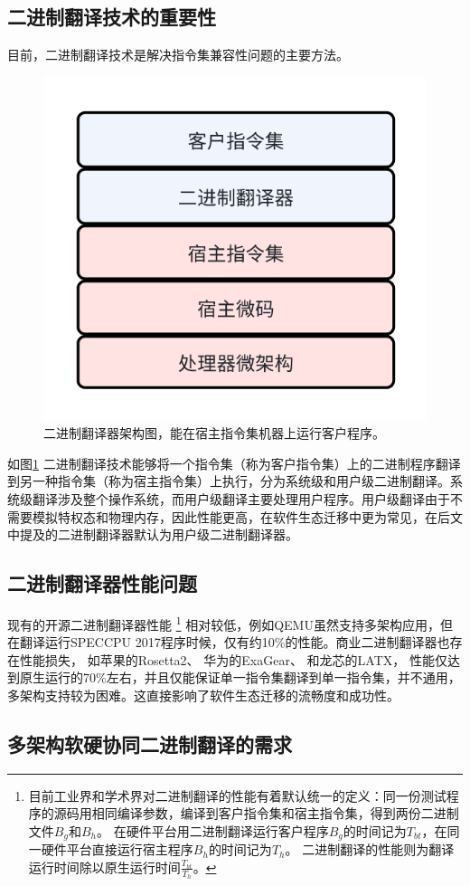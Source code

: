 \documentclass{Style/ucasproposal}%
\begin{document}
\subsection{二进制翻译技术的重要性}
目前，二进制翻译技术是解决指令集兼容性问题的主要方法。

\begin{figure}[h]
    \centering
    \includegraphics[width=0.3\linewidth]{./feishuImage/BT_arch.png}
    \caption{二进制翻译器架构图，能在宿主指令集机器上运行客户程序。}
    \label{img:BT_arch}
  \end{figure}

如图\ref{img:BT_arch} 二进制翻译技术能够将一个指令集（称为客户指令集）上的二进制程序翻译到另一种指令集（称为宿主指令集）上执行，分为系统级和用户级二进制翻译。系统级翻译涉及整个操作系统，而用户级翻译主要处理用户程序。用户级翻译由于不需要模拟特权态和物理内存，因此性能更高，在软件生态迁移中更为常见，在后文中提及的二进制翻译器默认为用户级二进制翻译器。

\subsection{二进制翻译器性能问题}
现有的开源二进制翻译器性能
\footnote{
    目前工业界和学术界对二进制翻译的性能有着默认统一的定义：同一份测试程序的源码用相同编译参数，编译到客户指令集和宿主指令集，得到两份二进制文件$B_g$和$B_h$。
    在硬件平台用二进制翻译运行客户程序$B_g$的时间记为$T_{bt}$，在同一硬件平台直接运行宿主程序$B_h$的时间记为$T_h$。
    二进制翻译的性能则为翻译运行时间除以原生运行时间$\frac{T_{bt}}{T_h}$。
}
相对较低，例如QEMU\cite{bellardQEMUFastPortable2005}虽然支持多架构应用，但在翻译运行SPECCPU 2017\cite{SPECCPU2017}程序时候，仅有约10\%的性能。商业二进制翻译器也存在性能损失，
如苹果的Rosetta2\cite{RosettaTranslationEnvironment, RunningIntelBinaries}、
华为的ExaGear\cite{KunPengExaGear}、
和龙芯的LATX\cite{LoongArchEnv2022, LoongArch2023}，
性能仅达到原生运行的70\%左右，并且仅能保证单一指令集翻译到单一指令集，并不通用，多架构支持较为困难。这直接影响了软件生态迁移的流畅度和成功性。

\subsection{多架构软硬协同二进制翻译的需求}
\end{document}
